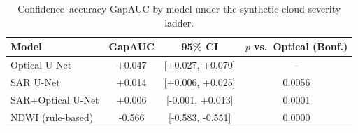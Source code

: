 \begin{table}[t]
\centering
\caption{Confidence--accuracy GapAUC by model under the synthetic cloud-severity ladder.}
\label{tab:gapauc}
\begin{tabular}{lccc}
\toprule
Model & GapAUC & 95\% CI & $p$ vs.\ Optical (Bonf.) \\
\midrule
Optical U-Net & +0.047 & [+0.027, +0.070] & -- \\
SAR U-Net & +0.014 & [+0.006, +0.025] & 0.0056 \\
SAR+Optical U-Net & +0.006 & [-0.001, +0.013] & 0.0001 \\
NDWI (rule-based) & -0.566 & [-0.583, -0.551] & 0.0000 \\
\bottomrule
\end{tabular}
\end{table}